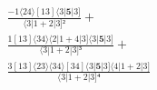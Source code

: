 \documentclass[varwidth, border=5pt]{standalone}
\begin{document}
\begin{my}
$\begin{gathered}
\scriptscriptstyle\frac{-1⟨24⟩[13]⟨3|𝟓|3]}{⟨3|1+2|3]²} +\\
\scriptscriptstyle\frac{1[13]⟨34⟩⟨2|1+4|3]⟨3|𝟓|3]}{⟨3|1+2|3]³} +\\
\scriptscriptstyle\frac{3[13]⟨23⟩⟨34⟩[34]⟨3|𝟓|3]⟨4|1+2|3]}{⟨3|1+2|3]⁴} \phantom{+}
\end{gathered}$
\end{my}
\end{document}

